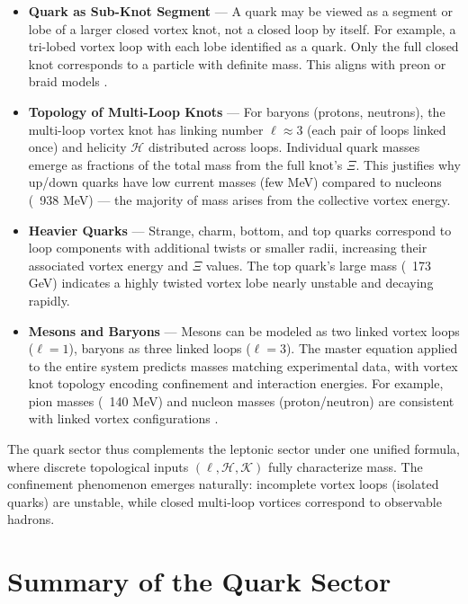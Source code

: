     \begin{itemize}
        \item \textbf{Quark as Sub-Knot Segment} — A quark may be viewed as a segment or lobe of a larger closed vortex knot, not a closed loop by itself. For example, a tri-lobed vortex loop with each lobe identified as a quark. Only the full closed knot corresponds to a particle with definite mass. This aligns with preon or braid models \cite{BilsonThompson2006}.

        \item \textbf{Topology of Multi-Loop Knots} — For baryons (protons, neutrons), the multi-loop vortex knot has linking number $\ell \approx 3$ (each pair of loops linked once) and helicity $\mathcal{H}$ distributed across loops. Individual quark masses emerge as fractions of the total mass from the full knot’s $\Xi$. This justifies why up/down quarks have low current masses (few MeV) compared to nucleons (~938 MeV) — the majority of mass arises from the collective vortex energy.

        \item \textbf{Heavier Quarks} — Strange, charm, bottom, and top quarks correspond to loop components with additional twists or smaller radii, increasing their associated vortex energy and $\Xi$ values. The top quark’s large mass (~173 GeV) indicates a highly twisted vortex lobe nearly unstable and decaying rapidly.

        \item \textbf{Mesons and Baryons} — Mesons can be modeled as two linked vortex loops ($\ell=1$), baryons as three linked loops ($\ell=3$). The master equation applied to the entire system predicts masses matching experimental data, with vortex knot topology encoding confinement and interaction energies. For example, pion masses (~140 MeV) and nucleon masses (proton/neutron) are consistent with linked vortex configurations \cite{Iskandarani2025f, Krafft1940}.
    \end{itemize}

    The quark sector thus complements the leptonic sector under one unified formula, where discrete topological inputs $(\ell,\mathcal{H},\mathcal{K})$ fully characterize mass. The confinement phenomenon emerges naturally: incomplete vortex loops (isolated quarks) are unstable, while closed multi-loop vortices correspond to observable hadrons.

    \section*{Summary of the Quark Sector}

